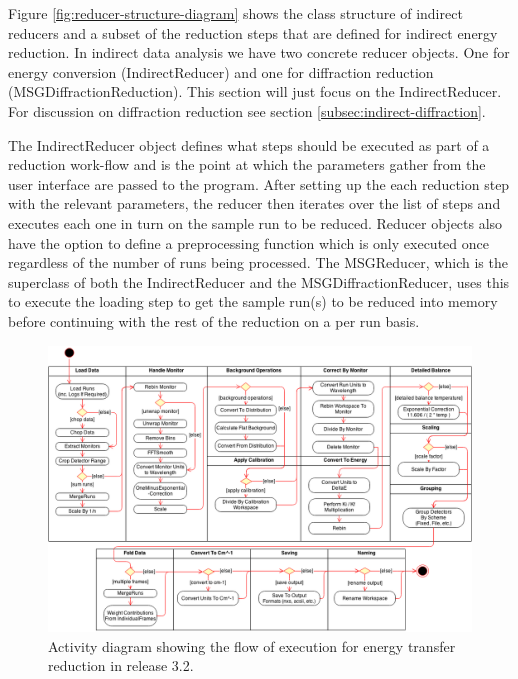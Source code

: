 \documentclass[paper=a4, fontsize=11pt]{scrartcl}	%
\numberwithin{equation}{section}															%
\numberwithin{figure}{section}																%
\numberwithin{table}{section}																%
\begin{document}
Figure \ref{fig:reducer-structure-diagram} shows the class structure of indirect reducers and a subset of the reduction steps that are defined for indirect energy reduction. In indirect data analysis we have two concrete reducer objects. One for energy conversion (IndirectReducer) and one for diffraction reduction (MSGDiffractionReduction). This section will just focus on the IndirectReducer. For discussion on diffraction reduction see section \ref{subsec:indirect-diffraction}.

The IndirectReducer object defines what steps should be executed as part of a reduction work-flow and is the point at which the parameters gather from the user interface are passed to the program. After setting up the each reduction step with the relevant parameters, the reducer then iterates over the list of steps and executes each one in turn on the sample run to be reduced. Reducer objects also have the option to define a preprocessing function which is only executed once regardless of the number of runs being processed. The MSGReducer, which is the superclass of both the IndirectReducer and the MSGDiffractionReducer, uses this to execute the loading step to get the sample run(s) to be reduced into memory before continuing with the rest of the reduction on a per run basis.

\begin{figure}[H]
\centering
\includegraphics[width=1\textwidth]{img/uml/activity_diagrams/EnergyTransfer_activity.png}
\caption{Activity diagram showing the flow of execution for energy transfer reduction in release 3.2.}
\label{fig:c2e-energy-transfer-activity-diagram}
\end{figure}
\end{document}
